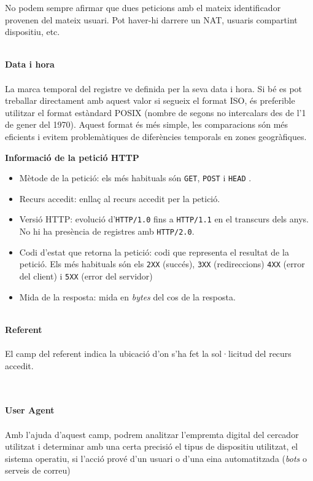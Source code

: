 \begin{tcolorbox}[colback=green!5!white, colframe=green!50!black, title=Els usuaris poden estar darrera d'un NAT]\label{tcbox:iguals-emmascarats}
    No podem sempre afirmar que dues peticions amb el mateix identificador provenen del mateix usuari.
    Pot haver-hi darrere un \gls{NAT}, usuaris compartint dispositiu, etc.
\end{tcolorbox}

\noindent \\
\textbf{Data i hora} \\ \\
La marca temporal del registre ve definida per la seva data i hora.
Si bé es pot treballar directament amb aquest valor si segueix el format \gls{ISO}, és preferible utilitzar el format estàndard \gls{POSIX} (nombre de segons no intercalars des de l'1 de gener del 1970).
Aquest format és més simple, les comparacions són més eficients i evitem problemàtiques de diferències temporals en zones geogràfiques.

\clearpage

\noindent
\textbf{Informació de la petició \gls{HTTP}}~\cite{http} \\

\begin{itemize}
    \item Mètode de la petició: els més habituals són \texttt{GET}, \texttt{POST} i \texttt{HEAD} .
    \item Recurs accedit: enllaç al recurs accedit per la petició.
    \item Versió \gls{HTTP}: evolució d'\texttt{HTTP/1.0} fins a \texttt{HTTP/1.1} en el transcurs dels anys.
    No hi ha presència de registres amb \texttt{HTTP/2.0}.
    \item Codi d'estat que retorna la petició: codi que representa el resultat de la petició.
    Els més habituals són els \texttt{2XX} (succés), \texttt{3XX} (redireccions) \texttt{4XX} (error del client) i \texttt{5XX} (error del servidor)
    \item Mida de la resposta: mida en \textit{bytes} del cos de la resposta.
\end{itemize}

\noindent \\
\textbf{Referent} \\ \\
El camp del referent indica la ubicació d’on s’ha fet la sol·licitud del recurs accedit.

\noindent \\ \\
\textbf{User Agent} \\ \\
Amb l’ajuda d’aquest camp, podrem analitzar l’empremta digital del cercador utilitzat i determinar amb una certa precisió el tipus de dispositiu utilitzat, el sistema operatiu, si l’acció prové d’un usuari o d’una eina automatitzada (\textit{bots} o serveis de correu)

